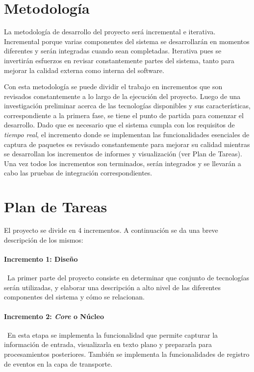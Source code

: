 \section*{Metodología}

La metodología de desarrollo del proyecto será incremental e iterativa. Incremental porque varias componentes del sistema se desarrollarán en momentos diferentes y serán integradas cuando sean completadas. Iterativa pues se invertirán esfuerzos en revisar constantemente partes del sistema, tanto para mejorar la calidad externa como interna del software\cite{ISOIEC9126}.

Con esta metodología se puede dividir el trabajo en incrementos que son revisados constantemente a lo largo de la ejecución del proyecto. Luego de una investigación preliminar acerca de las tecnologías disponibles y sus características, correspondiente a la primera fase, se tiene el punto de partida para comenzar el desarrollo. Dado que es necesario que el sistema cumpla con los requisitos de \textit{tiempo real}, el incremento donde se implementan las funcionalidades esenciales de captura de paquetes es revisado constantemente para mejorar su calidad mientras se desarrollan los incrementos de informes y visualización (ver Plan de Tareas). Una vez todos los incrementos son terminados, serán integrados y se llevarán a cabo las pruebas de integración correspondientes.

\newpage

\section*{Plan de Tareas}

El proyecto se divide en 4 incrementos. A continuación se da una breve descripción de los mismos:

\paragraph{Incremento 1: Diseño}\
La primer parte del proyecto consiste en determinar que conjunto de tecnologías serán utilizadas, y elaborar una descripción a alto nivel de las diferentes componentes del sistema y cómo se relacionan.
\paragraph{Incremento 2: \textit{Core} o Núcleo} \
En esta etapa se implementa la funcionalidad que permite capturar la información de entrada, visualizarla en texto plano y prepararla para procesamientos posteriores. También se implementa la funcionalidades de registro de eventos en la capa de transporte.
